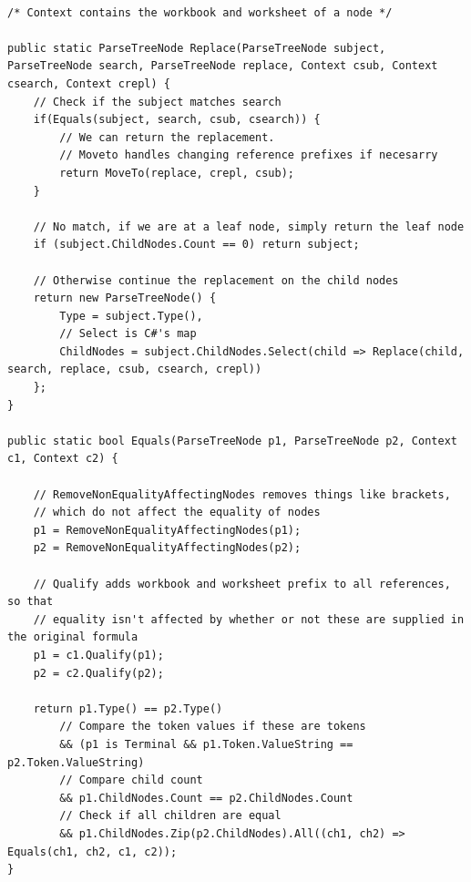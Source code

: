 \documentclass[12pt,a4paper,onecolumn,oneside,parskip]{memoir}
\begin{document}
\lstset{style=sharpc}
\begin{lstlisting}[float,caption={Formula AST replacement (simplified)}, label={lst:astreplace}]

/* Context contains the workbook and worksheet of a node */

public static ParseTreeNode Replace(ParseTreeNode subject, ParseTreeNode search, ParseTreeNode replace, Context csub, Context csearch, Context crepl) {
	// Check if the subject matches search
	if(Equals(subject, search, csub, csearch)) {
		// We can return the replacement.
		// Moveto handles changing reference prefixes if necesarry 
		return MoveTo(replace, crepl, csub);
	}
	
	// No match, if we are at a leaf node, simply return the leaf node
	if (subject.ChildNodes.Count == 0) return subject;
	
	// Otherwise continue the replacement on the child nodes
	return new ParseTreeNode() {
		Type = subject.Type(),
		// Select is C#'s map
		ChildNodes = subject.ChildNodes.Select(child => Replace(child, search, replace, csub, csearch, crepl))
	};
}

public static bool Equals(ParseTreeNode p1, ParseTreeNode p2, Context c1, Context c2) {
	
	// RemoveNonEqualityAffectingNodes removes things like brackets,
	// which do not affect the equality of nodes
	p1 = RemoveNonEqualityAffectingNodes(p1);
	p2 = RemoveNonEqualityAffectingNodes(p2);
	
	// Qualify adds workbook and worksheet prefix to all references, so that
	// equality isn't affected by whether or not these are supplied in the original formula
	p1 = c1.Qualify(p1);
	p2 = c2.Qualify(p2);
	
	return p1.Type() == p2.Type()
		// Compare the token values if these are tokens
	    && (p1 is Terminal && p1.Token.ValueString == p2.Token.ValueString)
	    // Compare child count
	    && p1.ChildNodes.Count == p2.ChildNodes.Count
	    // Check if all children are equal
	    && p1.ChildNodes.Zip(p2.ChildNodes).All((ch1, ch2) => Equals(ch1, ch2, c1, c2));
}
\end{lstlisting}
\end{document}
